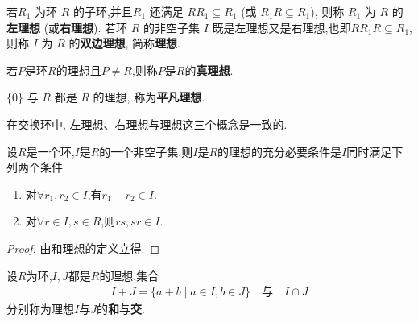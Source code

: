\documentclass[../../main.tex]{subfiles}%
\begin{document}
\begin{definition}
若\( R_1 \) 为环 \( R \) 的子环,并且\( R_1 \) 还满足 \( RR_1 \subseteq R_1 \) (或 \( R_1R \subseteq R_1 \)), 则称 \( R_1 \) 为 \( R \) 的\textbf{左理想} (或\textbf{右理想}). 若环 \( R \) 的非空子集 \( I \) 既是左理想又是右理想,也即$RR_1R\subseteq R_1$,则称 \( I \) 为 \( R \) 的\textbf{双边理想}, 简称\textbf{理想}.

若$P$是环$R$的理想且$P\neq R$,则称$P$是$R$的\textbf{真理想}.

\( \{0\} \) 与 \( R \) 都是 \( R \) 的理想, 称为\textbf{平凡理想}.
\end{definition}
\begin{remark}
在交换环中, 左理想、右理想与理想这三个概念是一致的.
\end{remark}

\begin{theorem}\label{theorem:环的理想的充要条件}
设$R$是一个环,$I$是$R$的一个非空子集,则$I$是$R$的理想的充分必要条件是$I$同时满足下列两个条件
\begin{enumerate}[(1)]
\item 对$\forall r_1,r_2\in I$,有$r_1-r_2\in I$.

\item 对$\forall r\in I,s\in R$,则$rs,sr\in I$.
\end{enumerate}
\end{theorem}
\begin{proof}
由和理想的定义立得.
\end{proof}

\begin{definition}
设$R$为环,$I,J$都是$R$的理想,集合
\begin{align*}
I+J = \{a+b \mid a \in I, b \in J\} \quad \text{与} \quad I\cap J
\end{align*}
分别称为理想$I$与$J$的\textbf{和}与\textbf{交}.
\end{definition}
\end{document}

